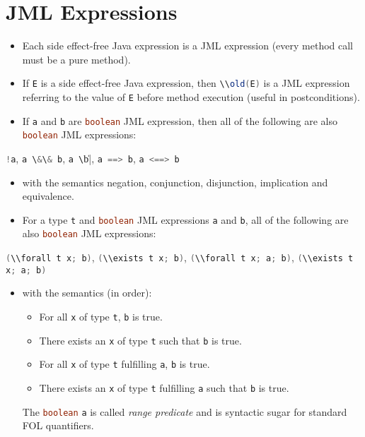 \documentclass[a4paper, 11pt, accentcolor = tud3b]{tudreport}
\newcommand{\inlineJava}[1]{\lstinline[language = Java]|#1|}
\begin{document}
		\section{JML Expressions}
			\begin{itemize}
				\item Each side effect-free Java expression is a JML expression (every method call must be a pure method).
				\item If \inlineJava{E} is a side effect-free Java expression, then \inlineJava{\\old(E)} is a JML expression referring to the value of \inlineJava{E} before method execution (useful in postconditions).
				\item If \inlineJava{a} and \inlineJava{b} are \inlineJava{boolean} JML expression, then all of the following are also \inlineJava{boolean} JML expressions:
			\end{itemize}
			\begin{center}
				\inlineJava{!a}, \quad \inlineJava{a \&\& b}, \quad \inlineJava{a \|\| b}, \quad \inlineJava{a ==> b}, \quad \inlineJava{a <==> b}
			\end{center}
			\begin{itemize}
				\item[] with the semantics negation, conjunction, disjunction, implication and equivalence.
				\item For a type \inlineJava{t} and \inlineJava{boolean} JML expressions \inlineJava{a} and \inlineJava{b}, all of the following are also \inlineJava{boolean} JML expressions:
			\end{itemize}
			\begin{center}
				\inlineJava{(\\forall t x; b)}, \quad \inlineJava{(\\exists t x; b)}, \quad \inlineJava{(\\forall t x; a; b)}, \quad \inlineJava{(\\exists t x; a; b)}
			\end{center}
			\begin{itemize}
				\item[] with the semantics (in order):
					\begin{itemize}
						\item For all \texttt{x} of type \texttt{t}, \texttt{b} is true.
						\item There exists an \texttt{x} of type \texttt{t} such that \texttt{b} is true.
						\item For all \texttt{x} of type \texttt{t} fulfilling \texttt{a}, \texttt{b} is true.
						\item There exists an \texttt{x} of type \texttt{t} fulfilling \texttt{a} such that \texttt{b} is true.
					\end{itemize}
					The \inlineJava{boolean} \texttt{a} is called \textit{range predicate} and is syntactic sugar for standard FOL quantifiers.
			\end{itemize}
		
\end{document}
